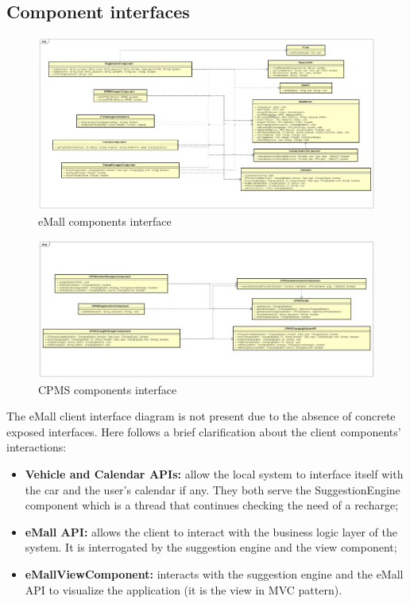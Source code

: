 \subsection{Component interfaces}
\begin{figure}[!h]
    \begin{center}
        \includegraphics[keepaspectratio, width=16cm]{Interface/eMallInterface.png}
        \caption{\ac{eMall} components interface}
        \label{fig:emall-interface}
    \end{center}
\end{figure}
\begin{figure}[!h]
    \begin{center}
        \includegraphics[keepaspectratio, width=16cm]{Interface/CPMSInterface.png}
        \caption{\ac{CPMS} components interface}
        \label{fig:cpms-interface}
    \end{center}
\end{figure}
The \ac{eMall} client interface diagram is not present due to the absence of concrete exposed interfaces. Here follows a brief clarification about the client components' interactions:
\begin{itemize}
    \item \textbf{Vehicle and Calendar \acp{API}:} allow the local system to interface itself with the car and the user's calendar if any. They both serve the SuggestionEngine component which is a thread that continues checking the need of a recharge;
    \item \textbf{\ac{eMall} \ac{API}:} allows the client to interact with the business logic layer of the system. It is interrogated by the suggestion engine and the view component;
    \item \textbf{\ac{eMall}ViewComponent:} interacts with the suggestion engine and the \ac{eMall} \ac{API} to visualize the application (it is the view in \ac{MVC} pattern).
\end{itemize}
